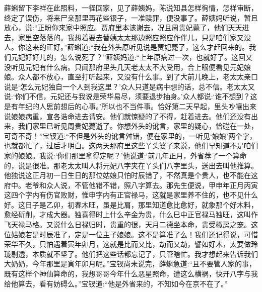 \begin{parag}
    薛蝌留下李祥在此照料，一径回家，见了薛姨妈，陈说知县怎样徇情，怎样审断，终定了误伤，将来尸亲那里再花些银子，一准赎罪，便没事了。薛姨妈听说，暂且放心，说:“正盼你来家中照应。贾府里本该谢去，况且周贵妃薨了，他们天天进去，家里空落落的。我想着要去替姨太太那边照应照应作伴儿，只是咱们家又没人。你这来的正好。”薛蝌道:“我在外头原听见说是贾妃薨了，这么才赶回来的。我们元妃好好儿的，怎么说死了？”薛姨妈道:“上年原病过一次，也就好了。这回又没听见元妃有什么病。只闻那府里头几天老太太不大受用，合上眼便看见元妃娘娘。众人都不放心，直至打听起来，又没有什么事。到了大前儿晚上，老太太亲口说是‘怎么元妃独自一个人到我这里？’众人只道是病中想的话，总不信。老太太又说:‘你们不信，元妃还与我说是荣华易尽，须要退步抽身。’众人都说:‘谁不想到？这是有年纪的人思前想后的心事。’所以也不当件事。恰好第二天早起，里头吵嚷出来说娘娘病重，宣各诰命进去请安。他们就惊疑的了不得，赶着进去。他们还没有出来，我们家里已听见周贵妃薨逝了。你想外头的讹言，家里的疑心，恰碰在一处，可奇不奇！”宝钗道:“不但是外头的讹言舛错，便在家里的，一听见‘娘娘’两个字，也就都忙了，过后才明白。这两天那府里这些丫头婆子来说，他们早知道不是咱们家的娘娘。我说:‘你们那里拿得定呢？’他说道:‘前几年正月，外省荐了一个算命的，说是很准。那老太太叫人将元妃八字夹在丫头们八字里头，送出去叫他推算。他独说这正月初一日生日的那位姑娘只怕时辰错了，不然真是个贵人，也不能在这府中。老爷和众人说，不管他错不错，照八字算去。那先生便说，甲申年正月丙寅这四个字内有伤官败财，惟申字内有正官禄马，这就是家里养不住的，也不见什么好。这日子是乙卯，初春木旺，虽是比肩，那里知道愈比愈好，就象那个好木料，愈经斫削，才成大器。独喜得时上什么辛金为贵，什么巳中正官禄马独旺，这叫作飞天禄马格。又说什么日禄归时，贵重的很，天月二德坐本命，贵受椒房之宠。这位姑娘若是时辰准了，定是一位主子娘娘。这不是算准了么！我们还记得说，可惜荣华不久，只怕遇着寅年卯月，这就是比而又比，劫而又劫，譬如好木，太要做玲珑剔透，本质就不坚了。他们把这些话都忘记了，只管瞎忙。我才想起来告诉我们大奶奶，今年那里是寅年卯月呢。”宝钗尚未说完，薛蝌急道:“且不要管人家的事，既有这样个神仙算命的，我想哥哥今年什么恶星照命，遭这么横祸，快开八字与我给他算去，看有妨碍么。”宝钗道:“他是外省来的，不知如今在京不在了。”
\end{parag}


